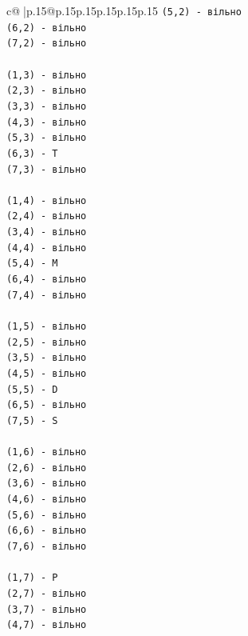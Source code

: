 \documentclass{article}
\begin{document}
{\begin{supertabular}{c@{$\;$}|p{.15\linewidth}@{}p{.15\linewidth}p{.15\linewidth}p{.15\linewidth}p{.15\linewidth}p{.15\linewidth}}
{{{\texttt{(5,2) {-} вільно} \\
\texttt{(6,2) {-} вільно} \\
\texttt{(7,2) {-} вільно} \\
\\ 
\texttt{(1,3) {-} вільно} \\
\texttt{(2,3) {-} вільно} \\
\texttt{(3,3) {-} вільно} \\
\texttt{(4,3) {-} вільно} \\
\texttt{(5,3) {-} вільно} \\
\texttt{(6,3) {-} T} \\
\texttt{(7,3) {-} вільно} \\
\\ 
\texttt{(1,4) {-} вільно} \\
\texttt{(2,4) {-} вільно} \\
\texttt{(3,4) {-} вільно} \\
\texttt{(4,4) {-} вільно} \\
\texttt{(5,4) {-} M} \\
\texttt{(6,4) {-} вільно} \\
\texttt{(7,4) {-} вільно} \\
\\ 
\texttt{(1,5) {-} вільно} \\
\texttt{(2,5) {-} вільно} \\
\texttt{(3,5) {-} вільно} \\
\texttt{(4,5) {-} вільно} \\
\texttt{(5,5) {-} D} \\
\texttt{(6,5) {-} вільно} \\
\texttt{(7,5) {-} S} \\
\\ 
\texttt{(1,6) {-} вільно} \\
\texttt{(2,6) {-} вільно} \\
\texttt{(3,6) {-} вільно} \\
\texttt{(4,6) {-} вільно} \\
\texttt{(5,6) {-} вільно} \\
\texttt{(6,6) {-} вільно} \\
\texttt{(7,6) {-} вільно} \\
\\ 
\texttt{(1,7) {-} P} \\
\texttt{(2,7) {-} вільно} \\
\texttt{(3,7) {-} вільно} \\
\texttt{(4,7) {-} вільно} \\
}}}
\end{supertabular}}
\end{document}
